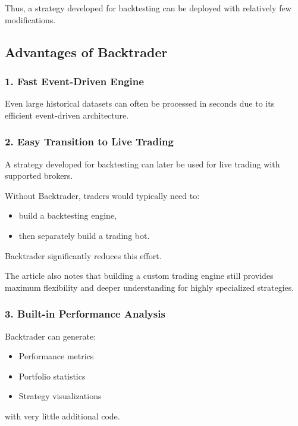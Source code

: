 \documentclass[12pt,openany]{book}
\begin{document}
Thus, a strategy developed for backtesting can be deployed with relatively few modifications.

\subsection{Advantages of Backtrader}

\subsubsection{1. Fast Event-Driven Engine}

Even large historical datasets can often be processed in seconds due to its efficient event-driven architecture.

\subsubsection{2. Easy Transition to Live Trading}

A strategy developed for backtesting can later be used for live trading with supported brokers.

Without Backtrader, traders would typically need to:

\begin{itemize}[leftmargin=*]
    \item build a backtesting engine,
    \item then separately build a trading bot.
\end{itemize}

Backtrader significantly reduces this effort.

The article also notes that building a custom trading engine still provides maximum flexibility and deeper understanding for highly specialized strategies.

\subsubsection{3. Built-in Performance Analysis}

Backtrader can generate:

\begin{itemize}[leftmargin=*]
    \item Performance metrics
    \item Portfolio statistics
    \item Strategy visualizations
\end{itemize}

with very little additional code.
\end{document}
